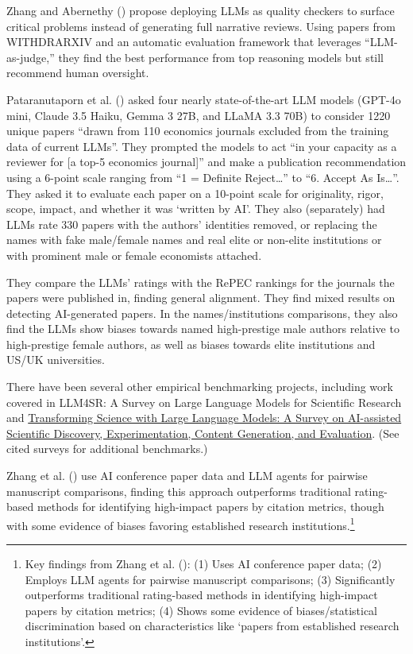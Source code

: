\documentclass[
  11pt,
  letterpaper,
  DIV=11,
  numbers=noendperiod]{scrreprt}
\begin{document}
Zhang and Abernethy () propose deploying
LLMs as quality checkers to surface critical problems instead of
generating full narrative reviews. Using papers from WITHDRARXIV and an
automatic evaluation framework that leverages ``LLM-as-judge,'' they
find the best performance from top reasoning models but still recommend
human oversight.

Pataranutaporn et al. () asked
four nearly state-of-the-art LLM models (GPT-4o mini, Claude 3.5 Haiku,
Gemma 3 27B, and LLaMA 3.3 70B) to consider 1220 unique papers ``drawn
from 110 economics journals excluded from the training data of current
LLMs''. They prompted the models to act ``in your capacity as a reviewer
for {[}a top-5 economics journal{]}'' and make a publication
recommendation using a 6-point scale ranging from ``1 = Definite
Reject\ldots{}'' to ``6. Accept As Is\ldots{}''. They asked it to
evaluate each paper on a 10-point scale for originality, rigor, scope,
impact, and whether it was `written by AI'. They also (separately) had
LLMs rate 330 papers with the authors' identities removed, or replacing
the names with fake male/female names and real elite or non-elite
institutions or with prominent male or female economists attached.

They compare the LLMs' ratings with the RePEC rankings for the journals
the papers were published in, finding general alignment. They find mixed
results on detecting AI-generated papers. In the names/institutions
comparisons, they also find the LLMs show biases towards named
high-prestige male authors relative to high-prestige female authors, as
well as biases towards elite institutions and US/UK universities.

There have been several other empirical benchmarking projects, including
work covered in LLM4SR: A Survey on Large Language Models for Scientific
Research and \href{https://arxiv.org/abs/2502.05151}{Transforming
Science with Large Language Models: A Survey on AI-assisted Scientific
Discovery, Experimentation, Content Generation, and Evaluation}. (See
cited surveys for additional benchmarks.)

Zhang et al. () use AI
conference paper data and LLM agents for pairwise manuscript
comparisons, finding this approach outperforms traditional rating-based
methods for identifying high-impact papers by citation metrics, though
with some evidence of biases favoring established research
institutions.\footnote{Key findings from Zhang et al.
  (): (1) Uses AI conference
  paper data; (2) Employs LLM agents for pairwise manuscript
  comparisons; (3) Significantly outperforms traditional rating-based
  methods in identifying high-impact papers by citation metrics; (4)
  Shows some evidence of biases/statistical discrimination based on
  characteristics like `papers from established research institutions'.}
\end{document}

